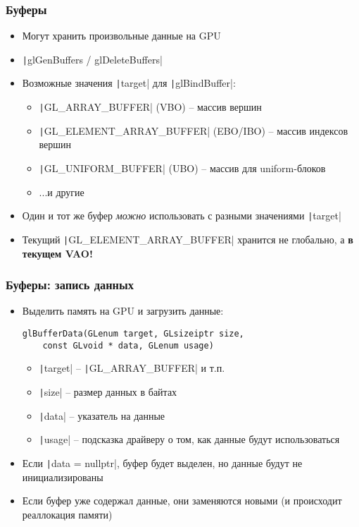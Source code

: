 \documentclass[10pt]{beamer}
\begin{document}
\begin{frame}[fragile]
\frametitle{Буферы}
\begin{itemize}
\item Могут хранить произвольные данные на GPU
\pause
\item \texttt|glGenBuffers / glDeleteBuffers|
\pause
\item Возможные значения \texttt|target| для \texttt|glBindBuffer|:
\begin{itemize}
\item \texttt|GL_ARRAY_BUFFER| (VBO) -- массив вершин
\pause
\item \texttt|GL_ELEMENT_ARRAY_BUFFER| (EBO/IBO) -- массив индексов вершин
\pause
\item \texttt|GL_UNIFORM_BUFFER| (UBO) -- массив для uniform-блоков
\pause
\item ...и другие
\end{itemize}
\pause
\item Один и тот же буфер \textit{можно} использовать с разными значениями \texttt|target|
\pause
\item Текущий \texttt|GL_ELEMENT_ARRAY_BUFFER| хранится не глобально, а \alert{\textbf{в текущем VAO!}}
\end{itemize}
\end{frame}

\begin{frame}[fragile]
\frametitle{Буферы: запись данных}
\begin{itemize}
\item Выделить память на GPU и загрузить данные:
\begin{verbatim}
glBufferData(GLenum target, GLsizeiptr size,
    const GLvoid * data, GLenum usage)
\end{verbatim}
\vspace*{-0.5cm}
\pause
{}
\begin{itemize}
\item \texttt|target| -- \texttt|GL_ARRAY_BUFFER| и т.п.
\item \texttt|size| -- размер данных в байтах
\item \texttt|data| -- указатель на данные
\item \texttt|usage| -- подсказка драйверу о том, как данные будут использоваться
\end{itemize}
\pause
\item Если \texttt|data = nullptr|, буфер будет выделен, но данные будут не инициализированы
\pause
\item Если буфер уже содержал данные, они заменяются новыми (и происходит реаллокация памяти)
\end{itemize}
\end{frame}
\end{document}
